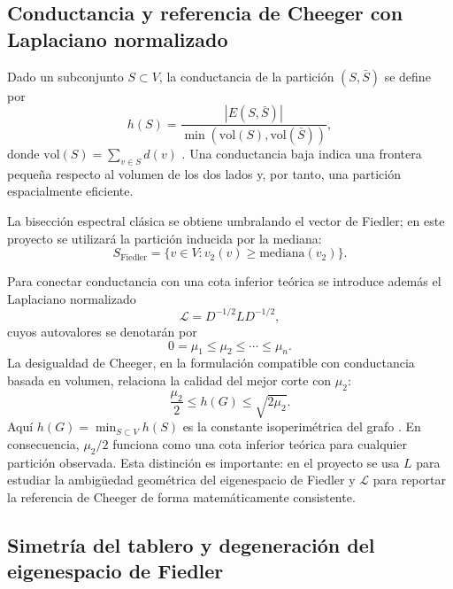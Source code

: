\documentclass[conference]{IEEEtran}
\begin{document}
\subsection{Conductancia y referencia de Cheeger con Laplaciano normalizado}

Dado un subconjunto $S \subset V$, la conductancia de la partición $(S,\bar{S})$ se define por
\begin{equation}
h(S)=\frac{|E(S,\bar{S})|}{\min(\mathrm{vol}(S),\mathrm{vol}(\bar{S}))},
\end{equation}
donde $\mathrm{vol}(S)=\sum_{v\in S} d(v)$ \cite{chung1997}. Una conductancia baja indica una frontera pequeña respecto al volumen de los dos lados y, por tanto, una partición espacialmente eficiente.

La bisección espectral clásica se obtiene umbralando el vector de Fiedler; en este proyecto se utilizará la partición inducida por la mediana:
\begin{equation}
S_{\mathrm{Fiedler}}=\{v \in V : v_2(v)\ge \mathrm{mediana}(v_2)\}.
\end{equation}

Para conectar conductancia con una cota inferior teórica se introduce además el Laplaciano normalizado
\begin{equation}
\mathcal{L} = D^{-1/2}LD^{-1/2},
\end{equation}
cuyos autovalores se denotarán por
\begin{equation}
0=\mu_1 \le \mu_2 \le \cdots \le \mu_n.
\end{equation}
La desigualdad de Cheeger, en la formulación compatible con conductancia basada en volumen, relaciona la calidad del mejor corte con $\mu_2$:
\begin{equation}
\frac{\mu_2}{2}\le h(G)\le \sqrt{2\mu_2}.
\end{equation}
Aquí $h(G)=\min_{S \subset V} h(S)$ es la constante isoperimétrica del grafo \cite{chung1997,cheeger1970}. En consecuencia, $\mu_2/2$ funciona como una cota inferior teórica para cualquier partición observada. Esta distinción es importante: en el proyecto se usa $L$ para estudiar la ambigüedad geométrica del eigenespacio de Fiedler y $\mathcal{L}$ para reportar la referencia de Cheeger de forma matemáticamente consistente.

\subsection{Simetría del tablero y degeneración del eigenespacio de Fiedler}
\end{document}
